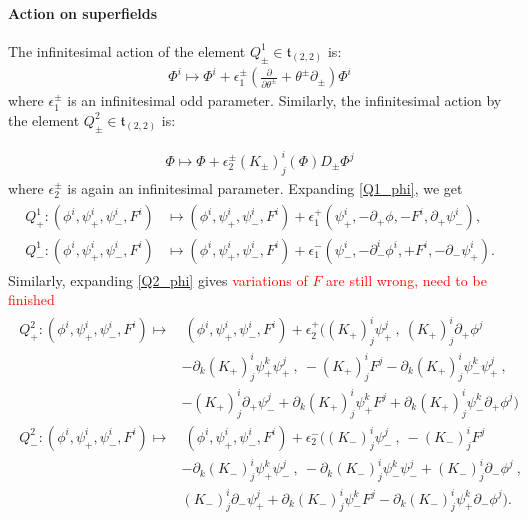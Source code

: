 \documentclass[letterpaper,12pt]{article}
\newcommand{\p}{\partial}
\theoremstyle{definition}
\theoremstyle{remark}
\theoremstyle{examples}
\begin{document}
\paragraph{Action on superfields} The infinitesimal action of the element $Q^1_{\pm} \in \mathfrak{t}_{(2,2)}$ is:
\begin{align}\label{Q1_phi}
\Phi^i \mapsto \Phi^i + \epsilon^{\pm}_1 \left( \frac{\p}{\p\theta^\pm}+\theta^\pm\p_\pm \right) \Phi^i
\end{align}
where $\epsilon^{\pm}_1$ is an infinitesimal odd parameter. Similarly, the infinitesimal action by the element $Q^2_{\pm} \in \mathfrak{t}_{(2,2)}$ is:

\begin{align}\label{Q2_phi}
 \Phi \mapsto \Phi + \epsilon^{\pm}_2 (K_\pm)^i_j(\Phi)D_\pm\Phi^j
\end{align}
where $\epsilon^\pm_2$ is again an infinitesimal parameter. Expanding \eqref{Q1_phi}, we get
\begin{align}\label{Q1_action}
\begin{aligned}
Q^1_{+} : (\phi^i, \psi^i_+, \psi^i_-, F^i) &\mapsto (\phi^i, \psi^i_+,\psi^i_-, F^i) + \epsilon^+_1 (\psi^i_+, -\partial_+ \phi, -F^i, \partial_+ \psi^i_-),\\
Q^1_{-} : (\phi^i, \psi^i_+, \psi^i_-, F^i)  &\mapsto (\phi^i, \psi^i_+,\psi^i_-, F^i) + \epsilon^-_1 (\psi^i_-, -\partial^i_- \phi^i, + F^i, - \partial_- \psi^i_+). 
\end{aligned}
\end{align}
Similarly, expanding \eqref{Q2_phi} gives \textcolor{red}{variations of $F$ are still wrong, need to be finished}
\begin{align}\label{Q2_action}
\begin{aligned}
Q^2_{+} : (\phi^i, \psi^i_+, \psi^i_-, F^i) \mapsto &\  (\phi^i, \psi^i_+, \psi^i_-, F^i)
+\epsilon_2^+\Big((K_+)^i_j \psi_+ ^j\ ,\  (K_+)^{i}_{j} \partial_+ \phi^j\\
& -\partial_k(K_+)^i_j \psi_+^k \psi_+^j\ ,\ -(K_+)^i_j F^j{-}\p_k(K_+)^i_j\psi^k_-\psi^j_+\ ,\ \\
&-(K_+)^i_j\p_+\psi_-^j+\p_k(K_+)^i_j\psi^k_+F^j+\p_k(K_+)^i_j\psi^k_-\p_+\phi^j\Big)\\
Q^2_{-} : (\phi^i, \psi^i_+, \psi^i_-, F^i) \mapsto &\ (\phi^i, \psi^i_+, \psi^i_-, F^i)
+\epsilon_2^-\Big((K_-)^i_j \psi_- ^j\ ,\ - (K_-)^i_j F^j  \\
&-\partial_k(K_-)^i_j \psi_+^k \psi_-^j\ ,\ -\p_k(K_-)^i_j\psi^k_-\psi^j_-+(K_-)^{i}_{j} \partial_- \phi^j\ ,\  \\
&(K_-)^i_j\p_-\psi_+^j+\p_k(K_-)^i_j\psi^k_-F^j-\p_k(K_-)^i_j\psi^k_+\p_-\phi^j\Big).
\end{aligned}
\end{align}
\end{document}
